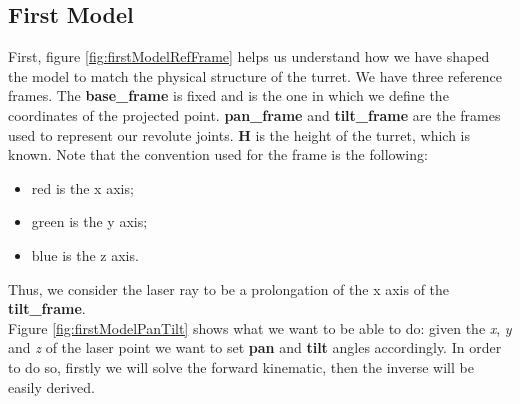 \subsection{First Model}\label{subs:firstModel}
First, figure \ref{fig:firstModelRefFrame} helps us understand how we have shaped the model to match the physical structure of the turret. We have three reference frames. The \textbf{base\_frame} is fixed and is the one in which we define the coordinates of the projected point. \textbf{pan\_frame} and \textbf{tilt\_frame} are the frames used to represent our revolute joints.
\textbf{H} is the height of the turret, which is known. Note that the convention used for the frame is the following:
\begin{itemize}
    \item red is the x axis;
    \item green is the y axis;
    \item blue is the z axis.
\end{itemize}
Thus, we consider the laser ray to be a prolongation of the x axis of the \textbf{tilt\_frame}. \\
Figure \ref{fig:firstModelPanTilt} shows what we want to be able to do: given the \textit{x}, \textit{y} and \textit{z} of the laser point we want to set \textbf{pan} and \textbf{tilt} angles accordingly. In order to do so, firstly we will solve the forward kinematic, then the inverse will be easily derived.
